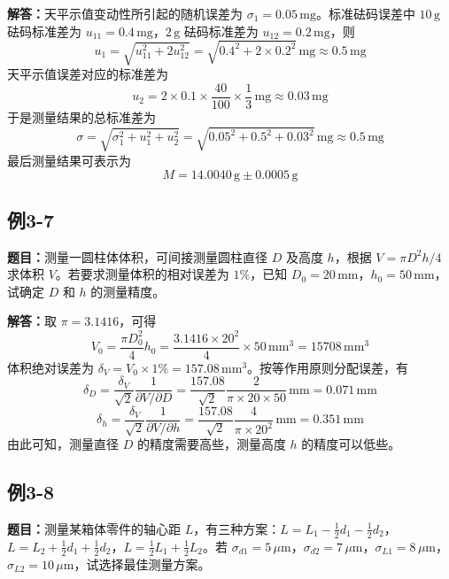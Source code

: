 \documentclass[UTF8,zihao=-4]{ctexart}
\newcommand{\problem}[1]{\subsection*{#1}}
\newcommand{\timu}{\noindent\textbf{题目：}}
\newcommand{\jieda}{\noindent\textbf{解答：}}
\begin{document}
\jieda 天平示值变动性所引起的随机误差为 $\sigma_1=0.05\,\mathrm{mg}$。标准砝码误差中 $10\,\mathrm{g}$ 砝码标准差为 $u_{11}=0.4\,\mathrm{mg}$，$2\,\mathrm{g}$ 砝码标准差为 $u_{12}=0.2\,\mathrm{mg}$，则
\begin{equation*}
    u_1=\sqrt{u_{11}^2+2u_{12}^2}=\sqrt{0.4^2+2\times0.2^2}\,\mathrm{mg}\approx0.5\,\mathrm{mg}
\end{equation*}
天平示值误差对应的标准差为
\begin{equation*}
    u_2=2\times0.1\times\frac{40}{100}\times\frac{1}{3}\,\mathrm{mg}\approx0.03\,\mathrm{mg}
\end{equation*}
于是测量结果的总标准差为
\begin{equation*}
    \sigma=\sqrt{\sigma_1^2+u_1^2+u_2^2}
    =\sqrt{0.05^2+0.5^2+0.03^2}\,\mathrm{mg}\approx0.5\,\mathrm{mg}
\end{equation*}
最后测量结果可表示为
\begin{equation*}
    M=14.0040\,\mathrm{g}\pm0.0005\,\mathrm{g}
\end{equation*}

\problem{例3-7}
\timu 测量一圆柱体体积，可间接测量圆柱直径 $D$ 及高度 $h$，根据 $V=\pi D^2h/4$ 求体积 $V$。若要求测量体积的相对误差为 $1\%$，已知 $D_0=20\,\mathrm{mm}$，$h_0=50\,\mathrm{mm}$，试确定 $D$ 和 $h$ 的测量精度。

\jieda 取 $\pi=3.1416$，可得
\begin{equation*}
    V_0=\frac{\pi D_0^2}{4}h_0=\frac{3.1416\times20^2}{4}\times50\,\mathrm{mm}^3=15708\,\mathrm{mm}^3
\end{equation*}
体积绝对误差为 $\delta_V=V_0\times1\%=157.08\,\mathrm{mm}^3$。按等作用原则分配误差，有
\begin{equation*}
    \delta_D=\frac{\delta_V}{\sqrt{2}}\frac{1}{\partial V/\partial D}
    =\frac{157.08}{\sqrt{2}}\frac{2}{\pi\times20\times50}\,\mathrm{mm}=0.071\,\mathrm{mm}
\end{equation*}
\begin{equation*}
    \delta_h=\frac{\delta_V}{\sqrt{2}}\frac{1}{\partial V/\partial h}
    =\frac{157.08}{\sqrt{2}}\frac{4}{\pi\times20^2}\,\mathrm{mm}=0.351\,\mathrm{mm}
\end{equation*}
由此可知，测量直径 $D$ 的精度需要高些，测量高度 $h$ 的精度可以低些。

\newpage

\problem{例3-8}
\timu 测量某箱体零件的轴心距 $L$，有三种方案：$L=L_1-\frac{1}{2}d_1-\frac{1}{2}d_2$，$L=L_2+\frac{1}{2}d_1+\frac{1}{2}d_2$，$L=\frac{1}{2}L_1+\frac{1}{2}L_2$。若 $\sigma_{d1}=5\,\mu\mathrm{m}$，$\sigma_{d2}=7\,\mu\mathrm{m}$，$\sigma_{L1}=8\,\mu\mathrm{m}$，$\sigma_{L2}=10\,\mu\mathrm{m}$，试选择最佳测量方案。
\end{document}
